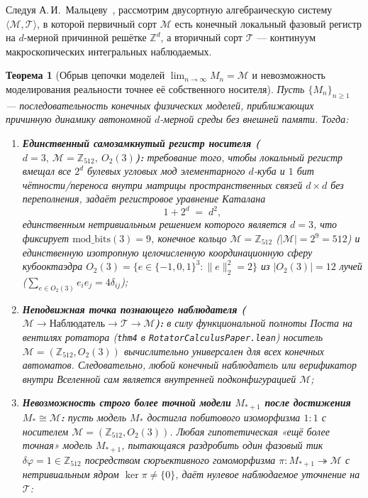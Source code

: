 \documentclass[11pt,a4paper]{article}
\newtheorem{theorem}{Теорема}[section]
\theoremstyle{definition}
\theoremstyle{remark}
\begin{document}
Следуя А.\,И.~Мальцеву~\cite{Malcev1970}, рассмотрим двусортную алгебраическую систему $\langle\mathcal{M},\mathcal{T}\rangle$, в которой первичный сорт $\mathcal{M}$ есть конечный локальный фазовый регистр на $d$-мерной причинной решётке $\mathbb{Z}^d$, а вторичный сорт $\mathcal{T}$ --- континуум макроскопических интегральных наблюдаемых.

\begin{theorem}[Обрыв цепочки моделей $\lim_{n\to\infty} M_n = \mathcal{M}$ и невозможность моделирования реальности точнее её собственного носителя]
\label{thm:model-chain-termination}
Пусть $\{M_n\}_{n\ge 1}$ --- последовательность конечных физических моделей, приближающих причинную динамику автономной $d$-мерной среды без внешней памяти. Тогда:
\begin{enumerate}[label=\textbf{(\roman*)},leftmargin=*]
\item \textbf{Единственный самозамкнутый регистр носителя ($d=3,\ \mathcal{M}=\mathbb{Z}_{512},\ O_2(3)$):}
  требование того, чтобы локальный регистр вмещал все $2^d$ булевых угловых мод элементарного $d$-куба и $1$ бит чётности/переноса внутри матрицы пространственных связей $d\times d$ без переполнения, задаёт регистровое уравнение Каталана
  \begin{equation}
    \label{eq:catalan-closure}
    1 + 2^d \;=\; d^2,
  \end{equation}
  единственным нетривиальным решением которого является $d = 3$, что фиксирует $\mathrm{mod\_bits}(3) = 9$, конечное кольцо $\mathcal{M} = \mathbb{Z}_{512}$ ($|\mathcal{M}| = 2^9 = 512$) и единственную изотропную целочисленную координационную сферу кубооктаэдра $O_2(3) = \{e\in\{-1,0,1\}^3 : \|e\|_2^2 = 2\}$ из $|O_2(3)| = 12$ лучей ($\sum_{e\in O_2(3)} e_i e_j = 4\delta_{ij}$);
\item \textbf{Неподвижная точка познающего наблюдателя ($\mathcal{M} \to \text{Наблюдатель} \to \mathcal{T} \to \mathcal{M}$):}
  в силу функциональной полноты Поста на вентилях ротатора (\texttt{thm4} в \texttt{RotatorCalculusPaper.lean}) носитель $\mathcal{M} = (\mathbb{Z}_{512}, O_2(3))$ вычислительно универсален для всех конечных автоматов. Следовательно, любой конечный наблюдатель или верификатор внутри Вселенной сам является внутренней подконфигурацией $\mathcal{M}$;
\item \textbf{Невозможность строго более точной модели $M_{*+1}$ после достижения $M_* \cong \mathcal{M}$:}
  пусть модель $M_*$ достигла побитового изоморфизма $1:1$ с носителем $\mathcal{M} = (\mathbb{Z}_{512}, O_2(3))$. Любая гипотетическая «ещё более точная» модель $M_{*+1}$, пытающаяся раздробить один фазовый тик $\delta\varphi = 1\in\mathbb{Z}_{512}$ посредством сюръективного гомоморфизма $\pi : M_{*+1} \twoheadrightarrow \mathcal{M}$ с нетривиальным ядром $\ker\pi \ne \{0\}$, даёт нулевое наблюдаемое уточнение на $\mathcal{T}$:

\end{enumerate}
\end{theorem}
\end{document}
